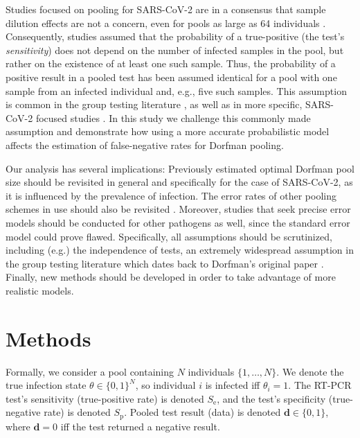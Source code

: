 \documentclass{article}
\newcommand{\data}{\mathbf{d}}
\newcommand{\sens}{S_{\text{e}}}
\newcommand{\spec}{S_{\text{p}}}
\begin{document}
Studies focused on pooling for SARS-CoV-2 are in a consensus that
sample dilution effects \cite{DilutionHIV, GroupDilution} are not a
concern, even for pools as large as 64 individuals \cite{PoolSize30,
  Lion, DorfmanYuvalDor, DilutionCOVID, CherifReview}. Consequently,
studies assumed that the probability of a true-positive (the test's
\emph{sensitivity}) does not depend on the number of infected samples
in the pool, but rather on the existence of at least one such
sample. Thus, the probability of a positive result in a pooled test
has been assumed identical for a pool with one sample from an infected
individual and, e.g., five such samples. This assumption is common in
the group testing literature \cite{Kim, OptimalDorfmanPool,
  CherifReview}, as well as in more specific, SARS-CoV-2 focused
studies \cite{Simplistic1, Simplistic2}. In this study we challenge
this commonly made assumption and demonstrate how using a more
accurate probabilistic model affects the estimation of false-negative
rates for Dorfman pooling.

Our analysis has several implications: Previously estimated optimal
Dorfman pool size \cite{OptimalDorfmanPool} should be revisited in
general and specifically for the case of SARS-CoV-2, as it is
influenced by the prevalence of infection. The error rates of other
pooling schemes in use should also be revisited \cite{BayesianDorfman,
  Kim}. Moreover, studies that seek precise error models should be
conducted for other pathogens as well, since the standard error model
could prove flawed. Specifically, all assumptions should be
scrutinized, including (e.g.) the independence of tests, an extremely
widespread assumption in the group testing literature \cite{Kim,
  OptimalDorfmanPool} which dates back to Dorfman's original paper
\cite{DorfmanOriginal}. Finally, new methods should be developed in
order to take advantage of more realistic models.

\section*{Methods}
Formally, we consider a pool containing $N$ individuals
$\{1,\dots,N\}$. We denote the true infection state $\theta \in
\{0,1\}^N$, so individual $i$ is infected iff $\theta_i=1$. The RT-PCR
test's sensitivity (true-positive rate) is denoted $\sens$, and the
test's specificity (true-negative rate) is denoted $\spec$. Pooled
test result (data) is denoted $\data \in \{0,1\}$, where $\data=0$ iff
the test returned a negative result.
\end{document}
